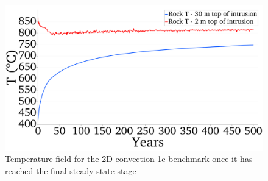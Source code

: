 \begin{figure}
	\centering
	\includegraphics[width=1\linewidth]{img/chapter3/rocks_2_points.png}
	\caption{Temperature field for the 2D convection 1c benchmark once it has reached the final steady state stage}
	\label{fig:rock_2_points}
\end{figure}



